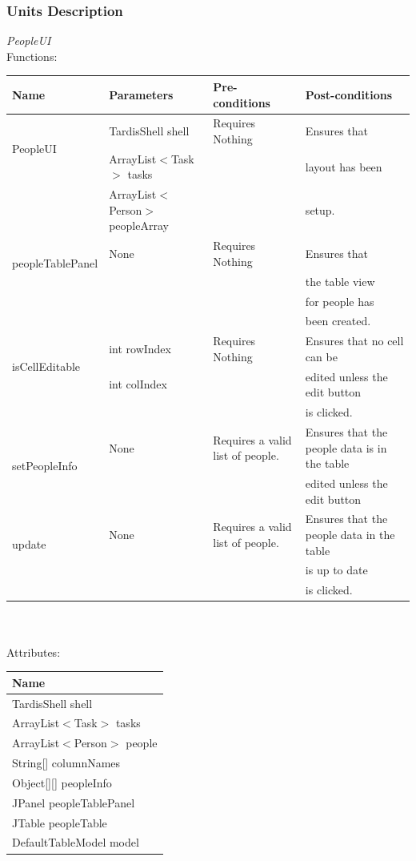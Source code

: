 \subsubsection{Units Description}
\emph{PeopleUI}\\
Functions:\\
\begin{tabular}{| l | l | l | l |}
\hline
Name & Parameters & Pre-conditions & Post-conditions\\
\hline
\multirow{2}{*}{PeopleUI}{} & TardisShell shell & Requires Nothing & Ensures that\\ 
			        & ArrayList$<$Task$>$ tasks & & layout has been\\ 
                                            & ArrayList$<$Person$>$ peopleArray & &  setup.
\\
\hline
\multirow{2}{*}{peopleTablePanel} & None & Requires Nothing & Ensures that\\
& & & the table view\\
& & & for people has\\
& & & been created.
\\
\hline
\multirow{2}{*}{isCellEditable} & int rowIndex & Requires Nothing & Ensures that no cell can be\\
		 		  & int colIndex & & edited unless the edit button\\
		 		  & & &  is clicked.
\\
\hline
\multirow{2}{*}{setPeopleInfo} & None & Requires a valid list of people. & Ensures that the people data is in the table\\
		 		    & & & edited unless the edit button
\\
\hline
\multirow{2}{*}{update} & None & Requires a valid list of people. & Ensures that the people data in the table\\
		 		      & & & is up to date\\
		 		      & & &  is clicked.
\\
\hline
\end{tabular}\\
\\
Attributes:\\
\begin{tabular}{| l |}
\hline
Name\\
\hline
TardisShell shell\\
\hline
ArrayList$<$Task$>$ tasks\\
\hline
ArrayList$<$Person$>$ people\\
\hline
String[] columnNames\\
\hline
Object[][] peopleInfo\\
\hline
JPanel peopleTablePanel\\
\hline
JTable peopleTable\\
\hline
DefaultTableModel model\\
\hline
\end{tabular}


